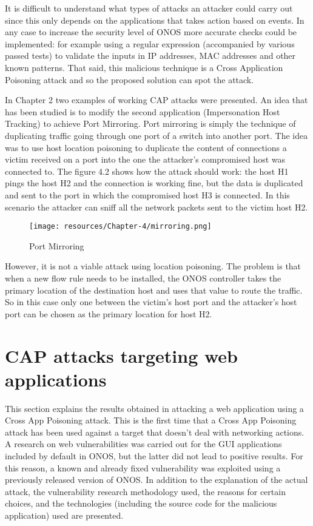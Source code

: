 It is difficult to understand what types of attacks an attacker could carry out since this only depends on the applications that takes action based on events. In any case to increase the security level of ONOS more accurate checks could be implemented: for example using a regular expression (accompanied by various passed tests) to validate the inputs in IP addresses, MAC addresses and other known patterns. That said, this malicious technique is a Cross Application Poisoning attack and so the proposed solution can spot the attack.
\medskip

In Chapter 2 two examples of working CAP attacks were presented. An idea that has been studied is to modify the second application (Impersonation Host Tracking) to achieve Port Mirroring. Port mirroring is simply the technique of duplicating traffic going through one port of a switch into another port. The idea was to use host location poisoning to duplicate the content of connections a victim received on a port into the one the attacker's compromised host was connected to. The figure 4.2 shows how the attack should work: the host H1 pings the host H2 and the connection is working fine, but the data is duplicated and sent to the port in which the compromised host H3 is connected. In this scenario the attacker can sniff all the network packets sent to the victim host H2.
\begin{figure}[h]
\caption{Port Mirroring}
\label{fig:mirroring}
\texttt{[image: resources/Chapter-4/mirroring.png]}
\centering
\end{figure}

However, it is not a viable attack using location poisoning. The problem is that when a new flow rule needs to be installed, the ONOS controller takes the primary location of the destination host and uses that value to route the traffic. So in this case only one between the victim's host port and the attacker's host port can be chosen as the primary location for host H2.

\clearpage


\section{CAP attacks targeting web applications}

This section explains the results obtained in attacking a web application using a Cross App Poisoning attack. This is the first time that a Cross App Poisoning attack has been used against a target that doesn't deal with networking actions. A research on web vulnerabilities was carried out for the GUI applications included by default in ONOS, but the latter did not lead to positive results. For this reason, a known and already fixed vulnerability was exploited using a previously released version of ONOS. In addition to the explanation of the actual attack, the vulnerability research methodology used, the reasons for certain choices, and the technologies (including the source code for the malicious application) used are presented.

